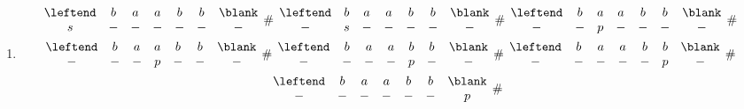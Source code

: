 \documentclass[12pt]{article}
\begin{document}
\begin{solution} \leavevmode
    \begin{enumerate}[label=(\alph*)]
        \item \small\begin{gather*}
            \begin{matrix}
                \leftend & b & a & a & b & b & \blank \\
                       s & - & - & - & - & - & - \\
            \end{matrix} \;\,\#\;\,
            \begin{matrix}
                \leftend & b & a & a & b & b & \blank \\
                       - & s & - & - & - & - & - \\
            \end{matrix} \;\,\#\;\,
            \begin{matrix}
                \leftend & b & a & a & b & b & \blank \\
                       - & - & p & - & - & - & - \\
            \end{matrix} \;\,\#\\
            \begin{matrix}
                \leftend & b & a & a & b & b & \blank \\
                       - & - & - & p & - & - & - \\
            \end{matrix} \;\,\#\;\,
            \begin{matrix}
                \leftend & b & a & a & b & b & \blank \\
                       - & - & - & - & p & - & - \\
            \end{matrix} \;\,\#\;\,
            \begin{matrix}
                \leftend & b & a & a & b & b & \blank \\
                       - & - & - & - & - & p & - \\
            \end{matrix} \;\,\#\\
            \begin{matrix}
                \leftend & b & a & a & b & b & \blank \\
                       - & - & - & - & - & - & p \\
            \end{matrix} \;\,\#\;\,

\end{gather*}
\end{enumerate}
\end{solution}
\end{document}
